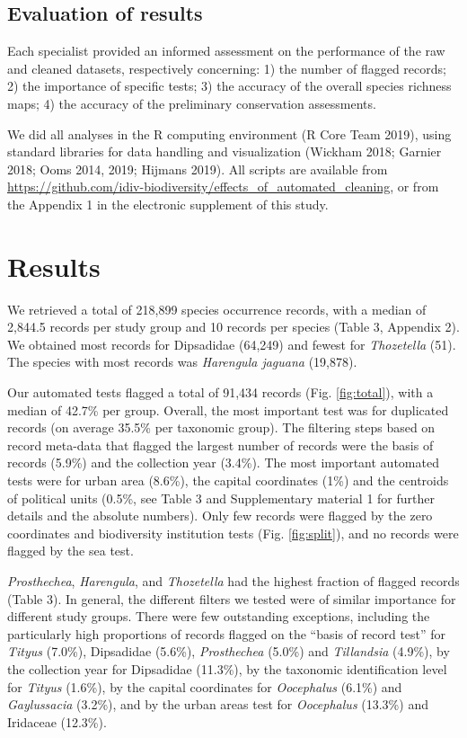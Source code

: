 \documentclass[fleqn,10pt,lineno]{wlpeerj} %
\begin{document}
\hypertarget{evaluation-of-results}{%
\subsection*{Evaluation of results}\label{evaluation-of-results}}

Each specialist provided an informed assessment on the performance of the raw and cleaned datasets, respectively concerning: 1) the number of flagged records; 2) the importance of specific tests; 3) the accuracy of the overall species richness maps; 4) the accuracy of the preliminary conservation assessments.

We did all analyses in the R computing environment (R Core Team 2019), using standard libraries for data handling and visualization (Wickham 2018; Garnier 2018; Ooms 2014, 2019; Hijmans 2019). All scripts are available from \url{https://github.com/idiv-biodiversity/effects_of_automated_cleaning}, or from the Appendix 1 in the electronic supplement of this study.

\hypertarget{results}{%
\section*{Results}\label{results}}

We retrieved a total of 218,899 species occurrence records, with a median of 2,844.5 records per study group and 10 records per species (Table 3, Appendix 2). We obtained most records for Dipsadidae (64,249) and fewest for \emph{Thozetella} (51). The species with most records was \emph{Harengula jaguana} (19,878).

Our automated tests flagged a total of 91,434 records (Fig. \ref{fig:total}), with a median of 42.7\% per group. Overall, the most important test was for duplicated records (on average 35.5\% per taxonomic group). The filtering steps based on record meta-data that flagged the largest number of records were the basis of records (5.9\%) and the collection year (3.4\%). The most important automated tests were for urban area (8.6\%), the capital coordinates (1\%) and the centroids of political units (0.5\%, see Table 3 and Supplementary material 1 for further details and the absolute numbers). Only few records were flagged by the zero coordinates and biodiversity institution tests (Fig. \ref{fig:split}), and no records were flagged by the sea test.

\emph{Prosthechea}, \emph{Harengula}, and \emph{Thozetella} had the highest fraction of flagged records (Table 3). In general, the different filters we tested were of similar importance for different study groups. There were few outstanding exceptions, including the particularly high proportions of records flagged on the ``basis of record test'' for \emph{Tityus} (7.0\%), Dipsadidae (5.6\%), \emph{Prosthechea} (5.0\%) and \emph{Tillandsia} (4.9\%), by the collection year for Dipsadidae (11.3\%), by the taxonomic identification level for \emph{Tityus} (1.6\%), by the capital coordinates for \emph{Oocephalus} (6.1\%) and \emph{Gaylussacia} (3.2\%), and by the urban areas test for \emph{Oocephalus} (13.3\%) and Iridaceae (12.3\%).
\end{document}

